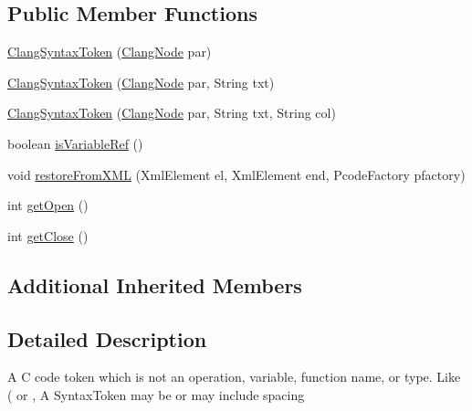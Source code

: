 \subsection*{Public Member Functions}
\begin{DoxyCompactItemize}
\item 
\mbox{\hyperlink{classghidra_1_1app_1_1decompiler_1_1_clang_syntax_token_ae72cb9672083df466cbc3b145659cea3}{Clang\+Syntax\+Token}} (\mbox{\hyperlink{interfaceghidra_1_1app_1_1decompiler_1_1_clang_node}{Clang\+Node}} par)
\item 
\mbox{\hyperlink{classghidra_1_1app_1_1decompiler_1_1_clang_syntax_token_a94f0661a0df9092d5600dfee3f528c91}{Clang\+Syntax\+Token}} (\mbox{\hyperlink{interfaceghidra_1_1app_1_1decompiler_1_1_clang_node}{Clang\+Node}} par, String txt)
\item 
\mbox{\hyperlink{classghidra_1_1app_1_1decompiler_1_1_clang_syntax_token_ae92e6638f6827729b38c416fc7b97a6a}{Clang\+Syntax\+Token}} (\mbox{\hyperlink{interfaceghidra_1_1app_1_1decompiler_1_1_clang_node}{Clang\+Node}} par, String txt, String col)
\item 
boolean \mbox{\hyperlink{classghidra_1_1app_1_1decompiler_1_1_clang_syntax_token_a10e5b7651f2b00e4d5daf4e04e2045f1}{is\+Variable\+Ref}} ()
\item 
void \mbox{\hyperlink{classghidra_1_1app_1_1decompiler_1_1_clang_syntax_token_a60088d748fb3e9d541b8c999270700fd}{restore\+From\+X\+ML}} (Xml\+Element el, Xml\+Element end, Pcode\+Factory pfactory)
\item 
int \mbox{\hyperlink{classghidra_1_1app_1_1decompiler_1_1_clang_syntax_token_ab1a7b47c4554b795b62e62b00a15f84c}{get\+Open}} ()
\item 
int \mbox{\hyperlink{classghidra_1_1app_1_1decompiler_1_1_clang_syntax_token_ab1f9a990950333ae4cbc02fe177fb7a8}{get\+Close}} ()
\end{DoxyCompactItemize}
\subsection*{Additional Inherited Members}


\subsection{Detailed Description}
A C code token which is not an operation, variable, function name, or type. Like \textquotesingle{}(\textquotesingle{} or \textquotesingle{},\textquotesingle{} A Syntax\+Token may be or may include spacing 

